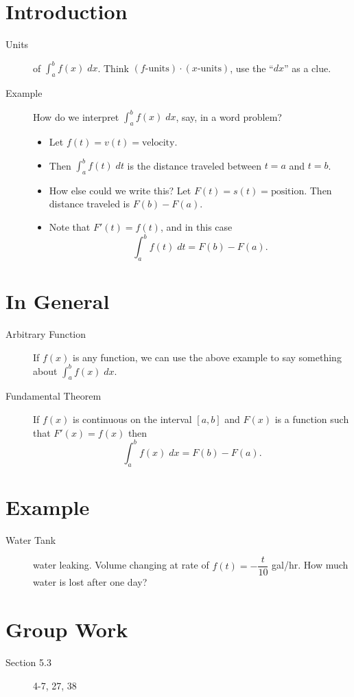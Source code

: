 \documentclass[11pt]{article}
\newcommand{\ds}{\displaystyle}
\begin{document}
\drawtitle

\section*{Introduction}
\begin{description}

\item[Units] of $\ds\int_a^b f(x)\;dx$.  Think
  $(f\text{-units})\cdot(x\text{-units})$, use the ``$dx$'' as a clue.
\item[Example] How do we interpret $\ds\int_a^b f(x)\;dx$, say, in a
  word problem?
  \begin{itemize}
  \item Let $f(t)=v(t)=\text{velocity}$.
  \item Then $\int_a^b f(t)\;dt$ is the distance traveled between
    $t=a$ and $t=b$.
  \item How else could we write this?  Let
    $F(t)=s(t)=\text{position}$.  Then distance traveled is
    $F(b)-F(a)$.
  \item Note that $F'(t)=f(t)$, and in this case
    \[
    \int_a^b f(t)\;dt = F(b)-F(a).
    \]
  \end{itemize}

\end{description}

\section*{In General}
\begin{description}
\item[Arbitrary Function] If $f(x)$ is any function, we can use the
  above example to say something about $\ds\int_a^b f(x)\;dx$.
\item[Fundamental Theorem] If $f(x)$ is continuous on the interval
  $[a,b]$ and $F(x)$ is a function such that $F'(x)=f(x)$ then
  \[
  \int_a^b f(x)\;dx = F(b)-F(a).
  \]
\end{description}

\section*{Example}
\begin{description}
\item[Water Tank] water leaking. Volume changing at rate of
  $f(t)=-\dfrac{t}{10}$ gal/hr.  How much water is lost after one day?
\end{description}


\section*{Group Work}
\begin{description}
\item[Section 5.3] 4-7, 27, 38
\end{description}
\end{document}
